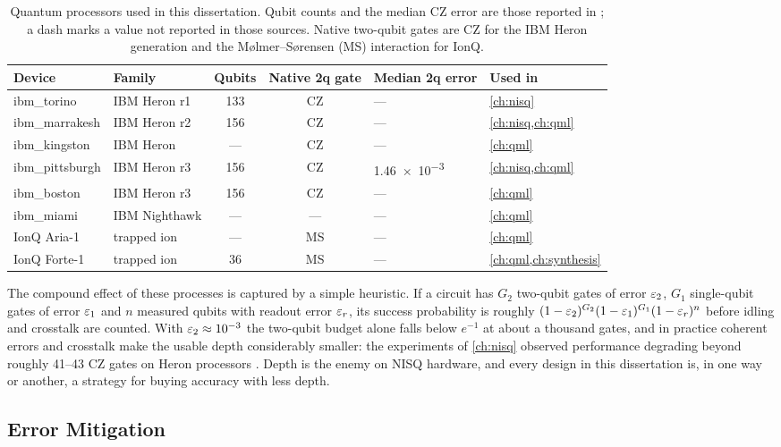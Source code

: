 \begin{table}[htbp]
\caption{Quantum processors used in this dissertation. Qubit counts and the median CZ error are those reported in \cite{guo2025deal,guo2025shardq,guo2025qawa,guo2025vqt,guo2025qpie,guo2026nnqa,guo2026rubriq}; a dash marks a value not reported in those sources. Native two-qubit gates are CZ for the IBM Heron generation and the M{\o}lmer--S{\o}rensen (MS) interaction for IonQ.}
\label{tab:bg:devices}
\centering\footnotesize
\begin{tabular}{@{}llccll@{}}
\toprule
Device & Family & Qubits & Native 2q gate & Median 2q error & Used in \\
\midrule
ibm\_torino & IBM Heron r1 & 133 & CZ & --- & \cref{ch:nisq} \\
ibm\_marrakesh & IBM Heron r2 & 156 & CZ & --- & \cref{ch:nisq,ch:qml} \\
ibm\_kingston & IBM Heron & --- & CZ & --- & \cref{ch:qml} \\
ibm\_pittsburgh & IBM Heron r3 & 156 & CZ & \num{1.46e-3} & \cref{ch:nisq,ch:qml} \\
ibm\_boston & IBM Heron r3 & 156 & CZ & --- & \cref{ch:qml} \\
ibm\_miami & IBM Nighthawk & --- & --- & --- & \cref{ch:qml} \\
IonQ Aria-1 & trapped ion & --- & MS & --- & \cref{ch:qml} \\
IonQ Forte-1 & trapped ion & 36 & MS & --- & \cref{ch:qml,ch:synthesis} \\
\bottomrule
\end{tabular}
\end{table}

The compound effect of these processes is captured by a simple heuristic. If a circuit has $G_2$ two-qubit gates of error $\varepsilon_2$, $G_1$ single-qubit gates of error $\varepsilon_1$ and $n$ measured qubits with readout error $\varepsilon_r$, its success probability is roughly $(1-\varepsilon_2)^{G_2}(1-\varepsilon_1)^{G_1}(1-\varepsilon_r)^{n}$ before idling and crosstalk are counted. With $\varepsilon_2\approx10^{-3}$ the two-qubit budget alone falls below $e^{-1}$ at about a thousand gates, and in practice coherent errors and crosstalk make the usable depth considerably smaller: the \deal{} experiments of \cref{ch:nisq} observed performance degrading beyond roughly 41--43 CZ gates on Heron processors \cite{guo2025deal}. Depth is the enemy on NISQ hardware, and every design in this dissertation is, in one way or another, a strategy for buying accuracy with less depth.

\subsection{Error Mitigation}

